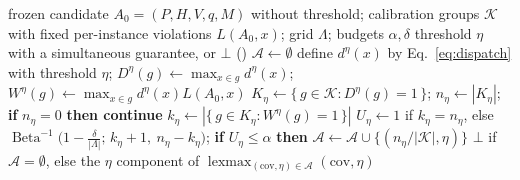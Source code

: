 \begin{algorithm}[t]
\caption{\textsc{Calibrate} --- fixed-grid exact selective admission. The score $q$ and
the grid $\Lambda$ are frozen \emph{before} this procedure sees a calibration group,
which is what makes the union bound legitimate.}
\label{alg:calibrate}
\footnotesize
\begin{algorithmic}[1]
\Require frozen candidate $A_0=(P,H,V,q,M)$ without threshold; calibration
         groups $\mathcal{K}$ with fixed per-instance violations $L(A_0,x)$;
         grid $\Lambda$; budgets $\alpha,\delta$
\Ensure threshold $\eta$ with a simultaneous guarantee, or $\bot$ (\retire)
\State $\mathcal{A}\gets\emptyset$ 
\ForAll{$\eta\in\Lambda$}
  \State define $d^\eta(x)$ by Eq.~\eqref{eq:dispatch} with threshold $\eta$;
         $D^\eta(g)\gets\max_{x\in g}d^\eta(x)$;
         $W^\eta(g)\gets\max_{x\in g}d^\eta(x)L(A_0,x)$
  \State $K_\eta\gets\{\,g\in\mathcal{K}:D^\eta(g)=1\,\}$;\quad
         $n_\eta\gets|K_\eta|$;\quad
         \textbf{if} $n_\eta=0$ \textbf{then continue}
  \State $k_\eta\gets|\{\,g\in K_\eta:W^\eta(g)=1\,\}|$
  \State $U_\eta\gets 1$ if $k_\eta=n_\eta$, else
         $\operatorname{Beta}^{-1}\!\big(1-\tfrac{\delta}{|\Lambda|};\,
         k_\eta+1,\ n_\eta-k_\eta\big)$;\quad
         \textbf{if} $U_\eta\le\alpha$ \textbf{then}
         $\mathcal{A}\gets\mathcal{A}\cup\{(n_\eta/|\mathcal{K}|,\eta)\}$
\EndFor
\State \Return $\bot$ if $\mathcal{A}=\emptyset$, else the $\eta$ component of
       $\operatorname*{lexmax}_{(\mathrm{cov},\eta)\in\mathcal{A}}
       (\mathrm{cov},\eta)$
\end{algorithmic}
\end{algorithm}
